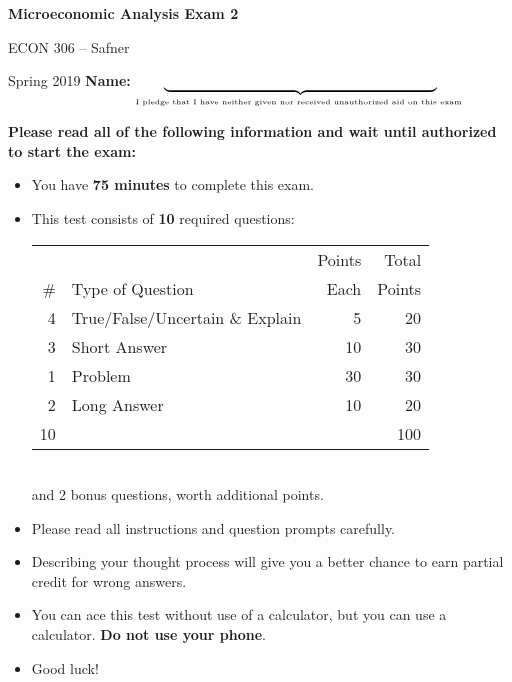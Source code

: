 \centerline{\huge \bf Microeconomic Analysis Exam 2}     
\vfill \vfill
   
ECON 306 -- Safner                            %

Spring 2019 \hfill                             %
{\bf Name: } $\underbrace{\hspace{2.7in}}_{\mbox{\tiny I pledge that I have neither given nor received unauthorized aid on this exam }}$
\\
\vfill \vfill \vfill

{\bf Please read all of the following information and wait until authorized to start the exam:}
\vspace{1pc}

\begin{itemize}                        %
	\item You have \textbf{75 minutes} to complete this exam.  
	\item This test consists of \textbf{10} required questions:\\
	\begin{table}[h!]
	\centering 	

	\begin{tabular}{rlrr}
	&  & Points & Total \\ 
	\# & Type of Question & Each & Points\\ \toprule
	4 & True/False/Uncertain \& Explain & 5 & 20\\
	3 & Short Answer & 10 & 30\\
	1 & Problem & 30 & 30\\
	2 & Long Answer & 10 & 20\\ \midrule 
	10 &  & & 100\\ \bottomrule
	\end{tabular}
		\end{table}\\
 and 2 bonus questions, worth additional points.
	\item Please read all instructions and question prompts carefully.
	\item Describing your thought process will give you a better chance to earn partial credit for wrong answers. 
	\item You can ace this test without use of a calculator, but you can use a calculator. \textbf{Do not use your phone}. 
	\item Good luck!
\end{itemize}

\vfill \vfill \vfill

\clearpage 
